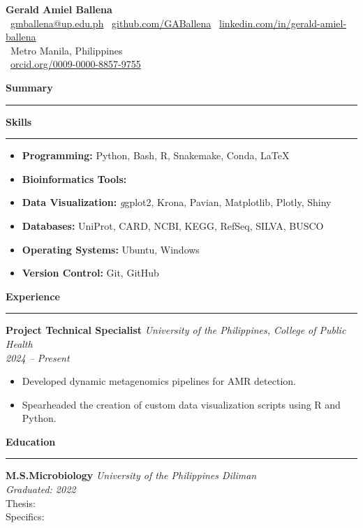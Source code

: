 \documentclass[a4paper,10pt]{article}
\newcommand{\sectiontitle}[1]{\vspace{10pt}\textbf{\Large #1}\vspace{5pt}\hrule\vspace{10pt}}
\begin{document}
	
	\begin{center}
		{\Huge \textbf{Gerald Amiel Ballena}} \\
		\vspace{3pt}
		\faEnvelope \ \href{mailto:gmballena@up.edu.ph}{gmballena@up.edu.ph} \quad
		\faGithub \ \href{https://github.com/GABallena}{github.com/GABallena} \quad
		\faLinkedin \ \href{https://linkedin.com/in/gerald-amiel-ballena}{linkedin.com/in/gerald-amiel-ballena} \\
		\vspace{3pt}
		\faMapMarker \ Metro Manila, Philippines \\
		 \ \href{https://orcid.org/0009-0000-8857-9755}{orcid.org/0009-0000-8857-9755}
	\end{center}
		
	
	\sectiontitle{Summary}
	
	
	\sectiontitle{Skills}
	\begin{itemize}[left=0pt]
		\item \textbf{Programming:} Python, Bash, R, Snakemake, Conda, LaTeX
		\item \textbf{Bioinformatics Tools:} 
		\item \textbf{Data Visualization:} \textit  ggplot2, Krona, Pavian, Matplotlib, Plotly, Shiny
		\item \textbf{Databases:} UniProt, CARD, NCBI, KEGG, RefSeq, SILVA, BUSCO
		\item \textbf{Operating Systems:} Ubuntu, Windows
		\item \textbf{Version Control:} Git, GitHub
	\end{itemize}
	
	\sectiontitle{Experience}
	
	\textbf{Project Technical Specialist} \hfill \textit{University of the Philippines, College of Public Health} \\
	\textit{2024 – Present}
	\begin{itemize}[left=0pt]
		\item Developed dynamic metagenomics pipelines for AMR detection.
		\item Spearheaded the creation of custom data visualization scripts using R and Python.
	\end{itemize}
	
	
	\sectiontitle{Education}
	
	\textbf{M.S.Microbiology} \hfill \textit{University of the Philippines Diliman} \\
	\textit{Graduated: 2022} \\
	Thesis: \textit{} \\
	Specifics: 
	
\end{document}
